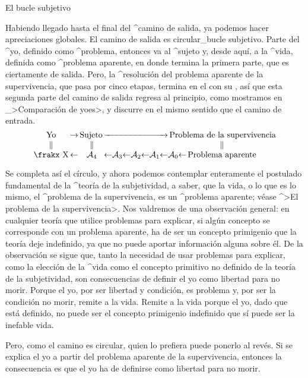 \Section El bucle subjetivo

Habiendo llegado hasta el final del ^{camino de salida}, ya podemos
hacer apreciaciones globales. El camino de salida es circular_{bucle
subjetivo}. Parte del ^{yo}, definido como ^{problema}, entonces va al
^{sujeto} y, desde aquí, a la ^{vida}, definida como ^{problema
aparente}, en donde termina la primera parte, que es ciertamente de
salida. Pero, la ^{resolución} del problema aparente de la
supervivencia, que pasa por cinco etapas, termina en el {\sujeto} con su
{\yo}, así que esta segunda parte del camino de salida regresa al
principio, como mostramos en _>Comparación de yoes>, y discurre en el
mismo sentido que el camino de entrada.
$$\vbox{\everycr={}\tabskip=0pt \lineskip=0pt
  \halign{&\hfil#\hfil\cr
   Yo& $\,\rightarrow\,$& Sujeto$\,$& \rightarrowfill& &
    $\,$Problema de la supervivencia\cr
   $\parallel$& &$\parallel$& & &$\parallel$\cr
   \frakx X& $\leftarrow$& ${\cal A}_4$& $\leftarrow$%
    ${\cal A}_3$$\leftarrow$${\cal A}_2$$\leftarrow$%
    ${\cal A}_1$$\leftarrow$& ${\cal A}_0$$\leftarrow$\hidewidth&
    Problema aparente\cr}}$$


Se completa así el círculo, y ahora podemos contemplar enteramente el
postulado fundamental de la ^{teoría de la subjetividad}, a saber, que
la vida, o lo que es lo mismo, el ^{problema de la supervivencia}, es un
^{problema aparente}; véase ^>El problema de la supervivencia>. Nos
valdremos de una observación general: en cualquier teoría que utilice
problemas para explicar, si algún concepto se corresponde con un
problema aparente, ha de ser un concepto primigenio que la teoría deje
indefinido, ya que no puede aportar información alguna sobre él. De la
observación se sigue que, tanto la necesidad de usar problemas para
explicar, como la elección de la ^{vida} como el concepto primitivo no
definido de la teoría de la subjetividad, son consecuencias de definir
el yo como libertad para no morir. Porque el yo, por ser libertad y
condición, es problema y, por ser la condición no morir, remite a la
vida. Remite a la vida porque el yo, dado que está definido, no puede
ser el concepto primigenio indefinido que sí puede ser la inefable vida.

Pero, como el camino es circular, quien lo prefiera puede ponerlo al
revés. Si se explica el yo a partir del problema aparente de la
supervivencia, entonces la consecuencia es que el yo ha de definirse
como libertad para no morir.

